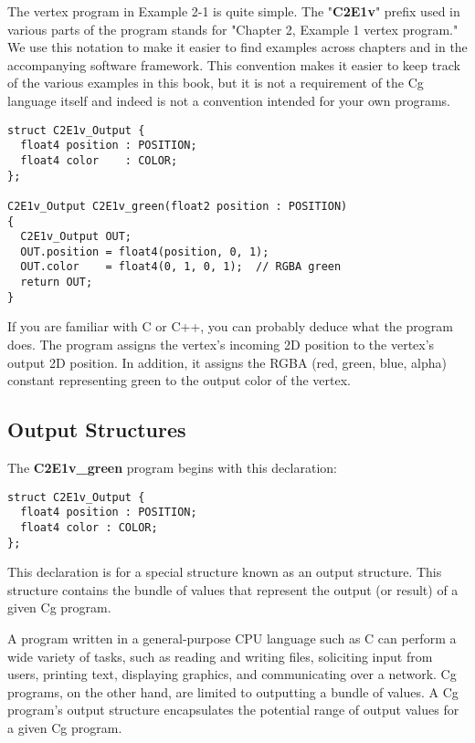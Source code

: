\documentclass[../main.tex]{subfiles}
\begin{document}
The vertex program in Example 2-1 is quite simple. The "\textbf{C2E1v}" prefix used in various parts of the program stands for "Chapter 2, Example 1 vertex program." We use this notation to make it easier to find examples across chapters and in the accompanying software framework. This convention makes it easier to keep track of the various examples in this book, but it is not a requirement of the Cg language itself and indeed is not a convention intended for your own programs.

\FloatBarrier
\begin{lstlisting}[caption=Example 2-1. The \textbf{C2E1v_green} Vertex Program]
struct C2E1v_Output {
  float4 position : POSITION;
  float4 color    : COLOR;
};

C2E1v_Output C2E1v_green(float2 position : POSITION)
{
  C2E1v_Output OUT;
  OUT.position = float4(position, 0, 1);
  OUT.color    = float4(0, 1, 0, 1);  // RGBA green
  return OUT;
}
\end{lstlisting}
\FloatBarrier

If you are familiar with C or C++, you can probably deduce what the program does. The program assigns the vertex's incoming 2D position to the vertex's output 2D position. In addition, it assigns the RGBA (red, green, blue, alpha) constant representing green to the output color of the vertex.

\subsection{Output Structures}

The \textbf{C2E1v_green} program begins with this declaration:

\FloatBarrier
\begin{lstlisting}
struct C2E1v_Output {
  float4 position : POSITION;
  float4 color : COLOR;
};
\end{lstlisting}
\FloatBarrier

This declaration is for a special structure known as an output structure. This structure contains the bundle of values that represent the output (or result) of a given Cg program.

A program written in a general-purpose CPU language such as C can perform a wide variety of tasks, such as reading and writing files, soliciting input from users, printing text, displaying graphics, and communicating over a network. Cg programs, on the other hand, are limited to outputting a bundle of values. A Cg program's output structure encapsulates the potential range of output values for a given Cg program.
\end{document}
